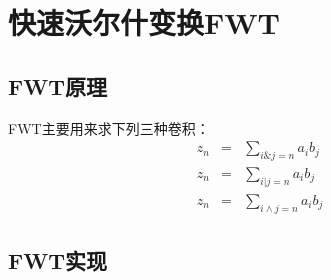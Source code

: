 \section{快速沃尔什变换FWT}
\subsection{FWT原理}
FWT主要用来求下列三种卷积：
\begin{eqnarray*}
    z_n&=&\sum_{i\&j=n}{a_ib_j}\\
    z_n&=&\sum_{i|j=n}{a_ib_j}\\
    z_n&=&\sum_{i\land j=n}{a_ib_j}
\end{eqnarray*}
\subsection{FWT实现}
